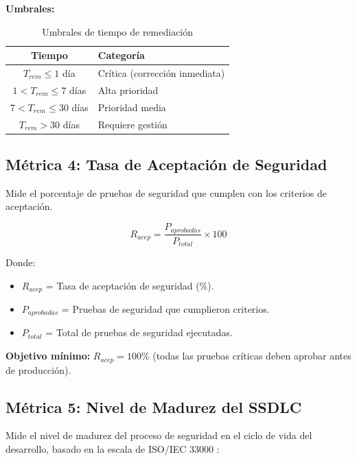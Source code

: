 \textbf{Umbrales:}
\begin{table}[h]
\centering
\begin{tabular}{|c|l|}
\hline
\textbf{Tiempo} & \textbf{Categoría} \\
\hline
$T_{rem} \leq 1$ día & Crítica (corrección inmediata) \\
$1 < T_{rem} \leq 7$ días & Alta prioridad \\
$7 < T_{rem} \leq 30$ días & Prioridad media \\
$T_{rem} > 30$ días & Requiere gestión \\
\hline
\end{tabular}
\caption{Umbrales de tiempo de remediación}
\label{tab:umbral-rem}
\end{table}

\subsection{Métrica 4: Tasa de Aceptación de Seguridad}

Mide el porcentaje de pruebas de seguridad que cumplen con los criterios de aceptación.

\begin{equation}
R_{acep} = \frac{P_{aprobadas}}{P_{total}} \times 100
\end{equation}

Donde:
\begin{itemize}
    \item $R_{acep}$ = Tasa de aceptación de seguridad (\%).
    \item $P_{aprobadas}$ = Pruebas de seguridad que cumplieron criterios.
    \item $P_{total}$ = Total de pruebas de seguridad ejecutadas.
\end{itemize}

\textbf{Objetivo mínimo:} $R_{acep} = 100\%$ (todas las pruebas críticas deben aprobar antes de producción).

\subsection{Métrica 5: Nivel de Madurez del SSDLC}

Mide el nivel de madurez del proceso de seguridad en el ciclo de vida del desarrollo, basado en la escala de ISO/IEC 33000 \cite{iso33000-committee}:

